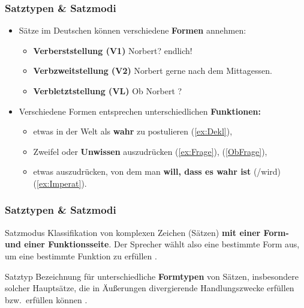 \begin{frame}
\frametitle{Satztypen \& Satzmodi}

\begin{itemize}
	\item Sätze im Deutschen können verschiedene \textbf{Formen} annehmen:
	\begin{itemize}
		\item \textbf{Verberststellung (V1)}
		\eal 
		\ex \label{ex:Frage}  Norbert?
		\ex \label{ex:Imperat}  endlich!
		\zl
		
		\item \textbf{Verbzweitstellung (V2)}
		\ea \label{ex:Dekl} Norbert  gerne nach dem Mittagessen.
		\z
		
		\item \textbf{Verbletztstellung (VL)}
		\ea \label{ObFrage} Ob Norbert ?
		\z
		
	\end{itemize}	

\pause

	\item Verschiedene Formen entsprechen unterschiedlichen \textbf{Funktionen:}
	\begin{itemize}
		\item etwas in der Welt als \textbf{wahr} zu postulieren (\ref{ex:Dekl}),
		\item Zweifel oder \textbf{Unwissen} auszudrücken (\ref{ex:Frage}), (\ref{ObFrage}),
		\item etwas auszudrücken, von dem man \textbf{will, dass es wahr ist} (/wird) (\ref{ex:Imperat}).		
	\end{itemize}
\end{itemize}

\end{frame}


\begin{frame}
\frametitle{Satztypen \& Satzmodi}

\begin{block}{Satzmodus}
Klassifikation von komplexen Zeichen (Sätzen) \textbf{mit einer Form- und einer Funktionsseite}. Der Sprecher wählt also eine bestimmte Form aus, um eine bestimmte Funktion zu erfüllen \citep[vgl.][]{Altmann93a}.
\end{block}


\pause 


\begin{block}{Satztyp}
Bezeichnung für unterschiedliche \textbf{Formtypen} von Sätzen, insbesondere solcher Hauptsätze, die in Äußerungen divergierende Handlungszwecke erfüllen bzw.\ erfüllen können \citep[vgl.][]{Fries16d, Fries16e}.
\end{block}


\end{frame}


